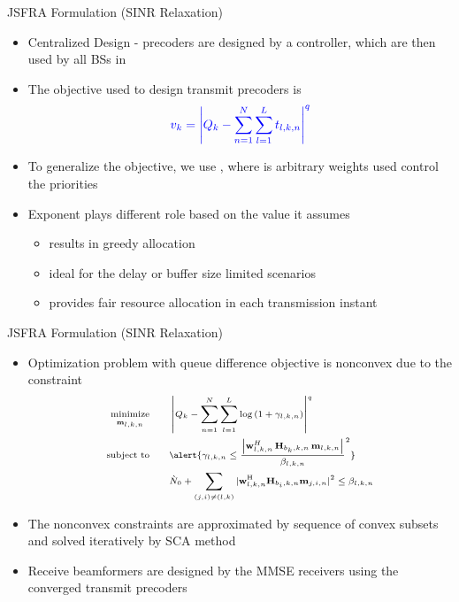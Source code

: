 \documentclass[9pt]{beamer}
\begin{document}
\begin{frame}{\acs{JSFRA} Formulation (\acs{SINR} Relaxation)}
\begin{itemize}
\item Centralized Design - precoders are designed by a controller, which are then used by all \acp{BS} in 
\item The objective used to design transmit precoders is 
\begin{equation}
\scriptsize {\color{blue} v_k = \left | Q_k - \sum_{n = 1}^N \sum_{l = 1}^{L} t_{l,k,n} \right |^q }
\end{equation}
\item To generalize the objective, we use , where  is arbitrary weights used control the priorities
\item Exponent  plays different role based on the value it assumes
	\begin{itemize}
	\item {} \alert{results in greedy allocation}
	\item {} \alert{ideal for the delay or buffer size limited scenarios}
	\item {} \alert{provides fair resource allocation in each transmission instant}
	\end{itemize}
\end{itemize}
\end{frame}

\begin{frame}{\acs{JSFRA} Formulation (\acs{SINR} Relaxation)}
\begin{itemize}
\item Optimization problem with queue difference objective is nonconvex due to the constraint
\begin{subequations}  \scriptsize
\begin{align}
\underset{\mvec{m}{l,k,n}}{\text{minimize}} & \qquad \left | Q_k - \sum_{n = 1}^N \sum_{l = 1}^{L} \log \left (1 + \gamma_{l,k,n} \right) \right |^q \\
\text{subject to} & \qquad \alert{\gamma_{l,k,n} \leq \dfrac{\left |\mvec{w}{l,k,n}^H \, \mvec{H}{b_k,k,n} \, \mvec{m}{l,k,n} \right |}{\beta_{l,k,n}}^2 } \\
& \qquad \enoise + \sum_{(j,i) \neq (l,k)} |\mvec{w}{l,k,n}^\herm \mvec{H}{b_i,k,n} \mvec{m}{j,i,n} |^2 \leq \beta_{l,k,n}
\end{align}
\end{subequations}
\item The nonconvex constraints are approximated by sequence of convex subsets and solved iteratively by \alert{\ac{SCA} method}
\item Receive beamformers are designed by the \acs{MMSE} receivers using the converged transmit precoders
\end{itemize}
\end{frame}
\end{document}
